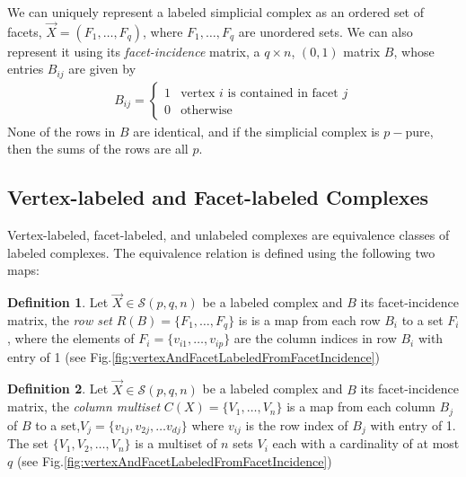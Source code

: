 \documentclass[12pt]{article}
\theoremstyle{plain}
\theoremstyle{definition}
\newtheorem{defn}{Definition}[section]
\theoremstyle{remark}
\begin{document}


We can uniquely represent a labeled simplicial complex as an ordered set of facets, $\vec{X}=(F_1,\dots,F_q)$, where $F_1,\dots, F_q$ are unordered sets. We can also represent it using its {\em facet-incidence} matrix, a $q\times n$, $(0,1)$ matrix $B$, whose entries $B_{ij}$ are given by 
\begin{align}
B_{ij} = \begin{cases}
1&\text{vertex $i$ is contained in facet $j$}\\
0&\text{otherwise}
\end{cases}
\end{align}
None of the rows in $B$ are identical, and if the simplicial complex is $p-$pure, then the sums of the rows are all $p$.  

\subsection{Vertex-labeled and Facet-labeled Complexes}
Vertex-labeled, facet-labeled, and unlabeled complexes are equivalence classes of labeled  complexes. The equivalence relation is defined using the following two maps:
\begin{defn}
    Let $\vec X\in\mathcal{S}(p,q,n)$ be a labeled complex and $B$ its facet-incidence matrix, the {\em row set} $R(B)=\{F_1,\dots,F_q\}$ is is a map from each row $B_i$ to a set $F_i$, where the elements of $F_i=\{v_{i1},\dots,v_{ip}\}$ are the column indices in row $B_{i}$ with entry of 1 (see Fig.\ref{fig:vertexAndFacetLabeledFromFacetIncidence})
\end{defn}
\begin{defn}
    Let $\vec X\in\mathcal{S}(p,q,n)$ be a labeled complex and $B$ its facet-incidence matrix, the {\em column multiset} $C(X)=\{V_1,\dots,V_n\}$ is a map from each column $B_j$ of $B$ to a set,$V_j=\{v_{1j},v_{2j},\dots v_{dj}\}$ where $v_{ij}$ is the row index of $B_j$ with entry of 1. The set $\{V_1,V_2,\dots,V_n\}$ is a multiset of $n$ sets $V_i$ each with a cardinality of at most $q$ (see Fig.\ref{fig:vertexAndFacetLabeledFromFacetIncidence})
\end{defn}
\end{document}
